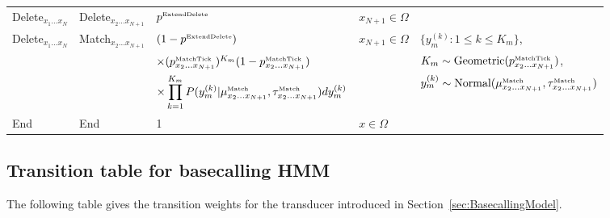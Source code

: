 \documentclass[10pt]{article}
\newcommand{\secref}[1]{Section~\ref{sec:#1}}
\newcommand{\seclabel}[1]{\label{sec:#1}}
\begin{document}
\begin{tabular}{lllll}
Delete${}_{x_1 \ldots x_N}$ & Delete${}_{x_2 \ldots x_{N+1}}$ & $p^{\mbox{\tiny ExtendDelete}}$ & $x_{N+1} \in \Omega$ & \\
Delete${}_{x_1 \ldots x_N}$ & Match${}_{x_2 \ldots x_{N+1}}$ & $(1 - p^{\mbox{\tiny ExtendDelete}})$ & $x_{N+1} \in \Omega$ & $\{ y_m^{(k)}: 1 \leq k \leq K_m \}$, \\
& & $\times (p^{\mbox{\tiny MatchTick}}_{x_2\ldots x_{N+1}})^{K_m} (1-p^{\mbox{\tiny MatchTick}}_{x_2\ldots x_{N+1}})$ & & $K_m \sim \mbox{Geometric}(p^{\mbox{\tiny MatchTick}}_{x_2\ldots x_{N+1}})$, \\
& & $\times \displaystyle \prod_{k=1}^{K_m} P(y^{(k)}_m|\mu^{\mbox{\tiny Match}}_{x_2\ldots x_{N+1}},\tau^{\mbox{\tiny Match}}_{x_2\ldots x_{N+1}}) dy^{(k)}_m$ & & $y_m^{(k)} \sim \mbox{Normal}(\mu^{\mbox{\tiny Match}}_{x_2\ldots x_{N+1}},\tau^{\mbox{\tiny Match}}_{x_2\ldots x_{N+1}})$ \\
End & End & 1 & $x \in \Omega$ & \\
\hline
\end{tabular}

\normalsize
\restoregeometry




\subsection{Transition table for basecalling HMM}
\seclabel{HMMTransitionTable}

The following table gives the transition weights for the transducer introduced in \secref{BasecallingModel}.

\small
\end{document}
